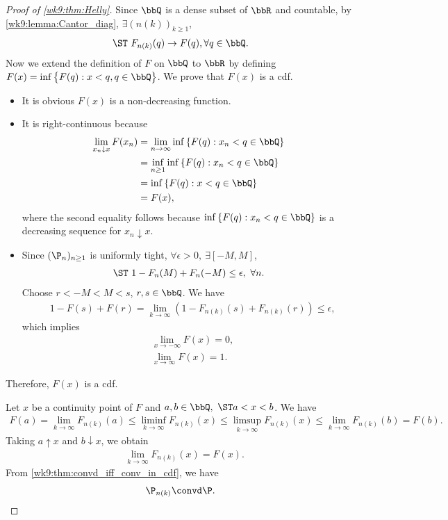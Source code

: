 \documentclass[../aipt.tex]{subfiles}
\begin{document}
\begin{proof}[Proof of \cref{wk9:thm:Helly}]
Since $\bbQ$ is a dense subset of $\bbR$ and countable, by \cref{wk9:lemma:Cantor_diag}, $\exists \left(n(k)\right)_{k \geq 1}$,
\begin{align*}
\ST\ F_{n(k)}(q) \to F(q), \forall q \in \bbQ.
\end{align*}
Now we extend the definition of $F$ on $\bbQ$ to $\bbR$ by defining $F(x) = \inf \big\{F(q): x < q, q \in \bbQ\big\}$. We prove that $F(x)$ is a cdf.
\begin{itemize}
	\item It is obvious $F(x)$ is a non-decreasing function. 
	\item It is right-continuous because
\begin{align*}
\lim_{x_n \downarrow x} F(x_n) 
&= \lim_{n \to \infty} \inf\left\{F(q) : x_n < q \in \bbQ\right\} \\
&= \inf_{n \geq 1} \inf\left\{F(q) : x_n < q \in \bbQ\right\} \\
&= \inf \left\{F(q) : x < q \in \bbQ\right\} \\
&= F(x),
\end{align*}
where the second equality follows because $\inf\left\{F(q) : x_n < q \in \bbQ\right\}$ is a decreasing sequence for $x_n\downarrow x$. 
\item Since $(\P_n)_{n \geq 1}$ is uniformly tight, $\forall \epsilon > 0, \ \exists [-M, M]$,
\begin{align*}
\ST\ 1 - F_n(M) + F_n(-M) \leq \epsilon, \ \forall n.
\end{align*}
Choose $r < -M < M < s$, $r, s \in \bbQ$. We have
\begin{align*}
&1 - F(s) + F(r) 
= \lim_{k \to \infty} \left(1 - F_{n(k)}(s) + F_{n(k)}(r)\right)
\leq \epsilon,
\end{align*}
which implies
\begin{align*}
&\lim_{x \to -\infty}F(x) = 0, \\
&\lim_{x \to \infty}F(x) = 1.
\end{align*}
\end{itemize}
Therefore, $F(x)$ is a cdf.

Let $x$ be a continuity point of $F$ and $a, b \in \bbQ, \ \ST a < x < b$. We have
\begin{align*}
F(a) 
= \lim_{k \to \infty} F_{n(k)}(a) 
\leq \liminf_{k \to \infty} F_{n(k)}(x)
\leq \limsup_{k \to \infty} F_{n(k)}(x)
\leq \lim_{k \to \infty} F_{n(k)}(b)
= F(b).
\end{align*}
Taking $a\uparrow x$ and $b\downarrow x$, we obtain
\begin{align*}
&\lim_{k \to \infty} F_{n(k)}(x) = F(x).
\end{align*}
From \cref{wk9:thm:convd_iff_conv_in_cdf}, we have
\begin{align*}
\P_{n(k)} \convd \P.
\end{align*}
\end{proof}
\end{document}
